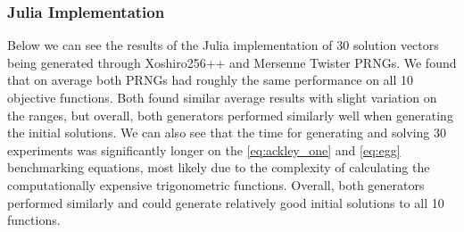 \documentclass{article}
\begin{document}
        \subsubsection{Julia Implementation}
Below we can see the results of the Julia implementation of 30 solution vectors being generated through Xoshiro256++ and Mersenne Twister PRNGs. We found that on average both PRNGs had roughly the same performance on all 10 objective functions. Both found similar average results with slight variation on the ranges, but overall, both generators performed similarly well when generating the initial solutions. We can also see that the time for generating and solving 30 experiments was significantly longer on the \ref{eq:ackley_one} and \ref{eq:egg} benchmarking equations, most likely due to the complexity of calculating the computationally expensive trigonometric functions. Overall, both generators performed similarly and could generate relatively good initial solutions to all 10 functions.
\end{document}
